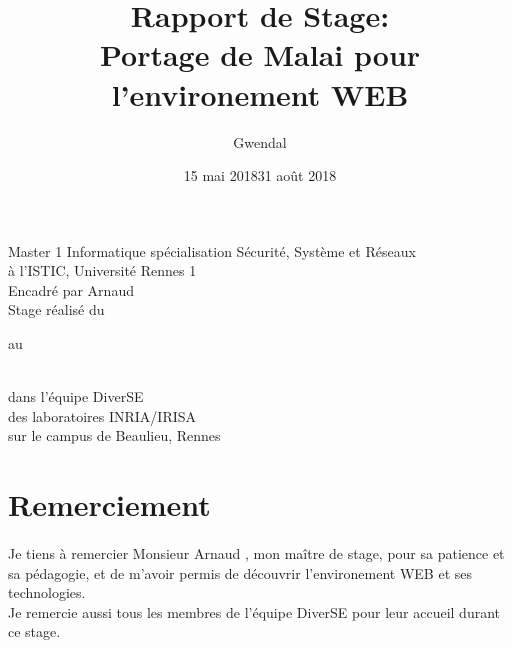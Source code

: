 \documentclass[11pt, a4paper, pdftex]{article}
\begin{document}
    \title{Rapport de Stage: \\ Portage de Malai pour l'environement WEB}
    \author{Gwendal }

    \maketitle
    \thispagestyle{empty}
    \begin{center}
        \vspace{0.25cm} Master 1 Informatique spécialisation Sécurité, Système et Réseaux \\ à l'ISTIC, Université Rennes 1 \\
        \vspace{0.25cm} Encadré par Arnaud  \\
        \vspace{0.25cm} Stage réalisé du \date{15 mai 2018} au \date{31 août 2018} \\ \vspace{0.25cm} dans l'équipe DiverSE \\ des laboratoires INRIA/IRISA \\ sur le campus de Beaulieu, Rennes
    \end{center}


    \newpage
    \setcounter{page}{1}
    \pagestyle{fancy}
    \renewcommand{\headrulewidth}{1pt}
    \fancyhead[C]{\leftmark}
    \fancyfoot[C]{\thepage/\pageref{LastPage}}
    \section*{Remerciement}\label{sec:remerciement}
    \paragraph{}
    Je tiens à remercier Monsieur Arnaud , mon maître de stage, pour sa patience et sa pédagogie, et de m'avoir permis de découvrir l'environement WEB et ses technologies. \\
    Je remercie aussi tous les membres de l'équipe DiverSE pour leur accueil durant ce stage.
    \newpage
\end{document}
